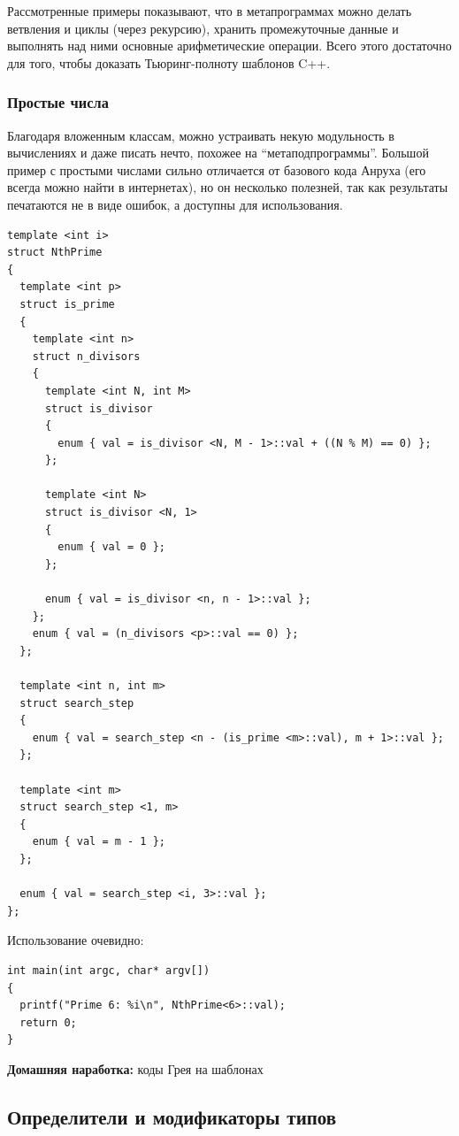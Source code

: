 \documentclass[a4paper,12pt,oneside]{article}
\begin{document}
Рассмотренные примеры показывают, что в метапрограммах можно делать ветвления и циклы (через рекурсию), хранить промежуточные данные и выполнять над ними основные арифметические операции. Всего этого достаточно для того, чтобы доказать Тьюринг-полноту шаблонов C++.

\subsubsection{Простые числа}\label{TemplatePrimes}

Благодаря вложенным классам, можно устраивать некую модульность в вычислениях и даже писать нечто, похожее на ``метаподпрограммы''. Большой пример с простыми числами сильно отличается от базового кода Анруха (его всегда можно найти в интернетах), но он несколько полезней, так как результаты печатаются не в виде ошибок, а доступны для использования.

\begin{lstlisting}
template <int i>
struct NthPrime
{
  template <int p>
  struct is_prime
  {
    template <int n>
    struct n_divisors
    {
      template <int N, int M>
      struct is_divisor
      {
        enum { val = is_divisor <N, M - 1>::val + ((N % M) == 0) };
      };

      template <int N>
      struct is_divisor <N, 1>
      {
        enum { val = 0 };
      };

      enum { val = is_divisor <n, n - 1>::val };
    };
    enum { val = (n_divisors <p>::val == 0) };
  };

  template <int n, int m>
  struct search_step
  {
    enum { val = search_step <n - (is_prime <m>::val), m + 1>::val };
  };

  template <int m>
  struct search_step <1, m>
  {
    enum { val = m - 1 };
  };

  enum { val = search_step <i, 3>::val };
};
\end{lstlisting}

Использование очевидно:

\begin{lstlisting}
int main(int argc, char* argv[])
{
  printf("Prime 6: %i\n", NthPrime<6>::val);
  return 0;
}
\end{lstlisting}

\textbf{Домашняя наработка:} коды Грея на шаблонах

\pagebreak
\subsection{Определители и модификаторы типов}
\end{document}
